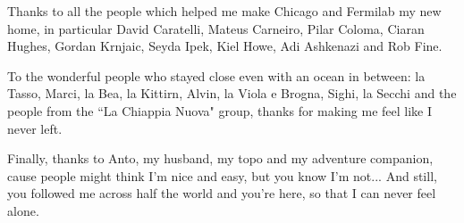 \documentclass[letterpaper,12pt]{yalephd}
\begin{document}
Thanks to all the people which helped me make Chicago and Fermilab my new home, in particular David Caratelli,  Mateus Carneiro, Pilar Coloma, Ciaran Hughes, Gordan Krnjaic, Seyda Ipek, Kiel Howe, Adi Ashkenazi and Rob Fine.

To the wonderful people who stayed close even with an ocean in between: la Tasso, Marci, la Bea, la Kittirn, Alvin, la Viola e Brogna, Sighi, la Secchi and the people from the ``La Chiappia Nuova" group, thanks for making me feel like I never left.

Finally, thanks to Anto, my husband, my topo and my adventure companion, cause people might think I'm nice and easy, but you know I'm not... And still, you followed me across half the world and you're here, so that I can never feel alone.



\mainmatter










\appendix









\backmatter
{}



\end{document}
